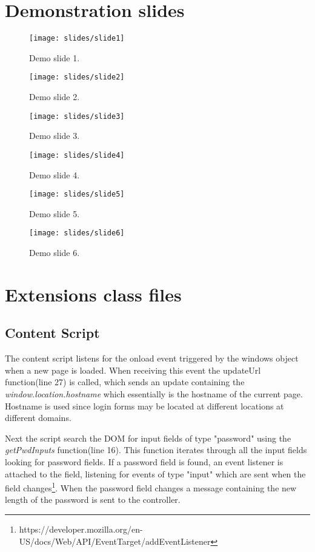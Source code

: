 \chapter{Demonstration slides}

\begin{figure}
    \texttt{[image: slides/slide1]}
    \caption{Demo slide 1.}
    \label{slide1}
\end{figure}


\begin{figure}
    \texttt{[image: slides/slide2]}
    \caption{Demo slide 2.}
    \label{slide2}
\end{figure}


\begin{figure}
    \texttt{[image: slides/slide3]}
    \caption{Demo slide 3.}
    \label{slide3}
\end{figure}


\begin{figure}
    \texttt{[image: slides/slide4]}
    \caption{Demo slide 4.}
    \label{slide4}
\end{figure}

\begin{figure}
    \texttt{[image: slides/slide5]}
    \caption{Demo slide 5.}
    \label{slide5}
\end{figure}


\begin{figure}
    \texttt{[image: slides/slide6]}
    \caption{Demo slide 6.}
    \label{slide6}
\end{figure}


\chapter{Extensions class files}

\section{Content Script}\label{app:content-script}


The content script listens for the onload event triggered by the windows object when a new page is loaded. When receiving this event the updateUrl function(line 27) is called, which sends an update containing the \emph{window.location.hostname} which essentially is the hostname of the current page. Hostname is used since login forms may be located at different locations at different domains.
\par Next the script search the DOM for input fields of type "password" using the \emph{getPwdInputs} function(line 16). This function iterates through all the input fields looking for password fields. If a password field is found, an event listener is attached to the field, listening for events of type "input" which are sent when the field changes\footnote{https://developer.mozilla.org/en-US/docs/Web/API/EventTarget/addEventListener}. When the password field changes a message containing the new length of the password is sent to the controller. 


